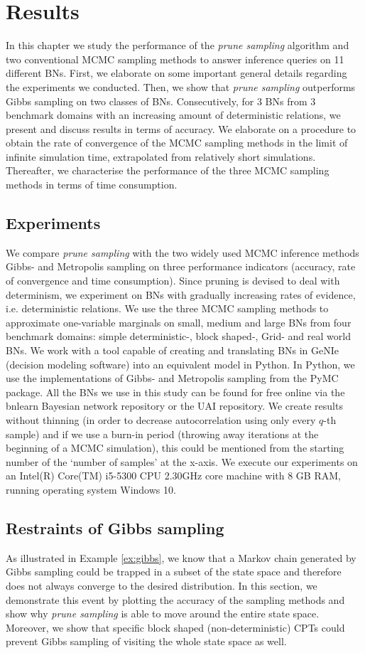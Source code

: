 \documentclass[a4paper, twoside, 11pt]{report}
\theoremstyle{plain}
\theoremstyle{definition}
\theoremstyle{remark}
\newcommand{\ps}{\textit{prune sampling }}
\begin{document}
\chapter{Results}
In this chapter we study the performance of the \ps algorithm and two conventional MCMC sampling methods to
answer inference queries on 11 different BNs. First, we elaborate on some important general details regarding the experiments we conducted. Then, we show that \ps outperforms Gibbs sampling on two classes of BNs. Consecutively, for 3 BNs from 3 benchmark domains with an increasing amount of deterministic relations, we present and discuss results in terms of accuracy. We elaborate on a procedure to obtain the rate of convergence of the MCMC sampling methods in the limit of infinite simulation time, extrapolated from relatively short simulations. Thereafter, we characterise the performance of the three MCMC sampling methods in terms of time consumption. 

\section{Experiments}
We compare \ps with the two widely used MCMC inference methods Gibbs- and Metropolis sampling on three performance indicators (accuracy, rate of convergence and time consumption). Since pruning is devised to deal with determinism, we experiment on BNs with gradually increasing rates of evidence, i.e. deterministic relations. We use the three MCMC sampling methods to approximate one-variable marginals on small, medium and large BNs from four benchmark domains: simple deterministic-, block shaped-, Grid- and real world BNs. We work with a tool capable of creating and translating BNs in GeNIe (decision modeling software) into an equivalent model in Python. In Python, we use the implementations of Gibbs- and Metropolis sampling from the PyMC package. All the BNs we use in this study can be found for free online via the bnlearn Bayesian network repository or the UAI repository. We create results without thinning (in order to decrease autocorrelation using only every $q$-th sample) and if we use a burn-in period (throwing away iterations at the beginning of a MCMC simulation), this could be mentioned from the starting number of the `number of samples' at the x-axis. We execute our experiments on an Intel(R) Core(TM) i5-5300 CPU 2.30GHz core machine with 8 GB RAM, running operating system Windows 10.

\section{Restraints of Gibbs sampling}\label{sec:gibbs-res}
As illustrated in Example \ref{ex:gibbs}, we know that a Markov chain generated by Gibbs sampling could be trapped in a subset of the state space and therefore does not always converge to the desired distribution. In this section, we demonstrate this event by plotting the accuracy of the sampling methods and show why \ps is able to move around the entire state space. Moreover, we show that specific block shaped (non-deterministic) CPTs could prevent Gibbs sampling of visiting the whole state space as well. \\
\end{document}
